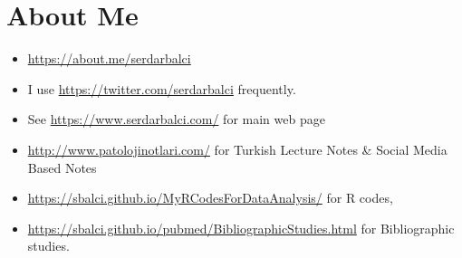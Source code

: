 \documentclass[10pt,a4paper,]{twentysecondcv}
\providecommand{\tightlist}{%
  \setlength{\itemsep}{0pt}\setlength{\parskip}{0pt}}
\begin{document}



\makeprofile %




\hypertarget{about-me}{%
\section{About Me}\label{about-me}}

\begin{itemize}
\tightlist
\item
  \url{https://about.me/serdarbalci}
\item
  I use \url{https://twitter.com/serdarbalci} frequently.
\item
  See \url{https://www.serdarbalci.com/} for main web page
\item
  \url{http://www.patolojinotlari.com/} for Turkish Lecture Notes \& Social Media Based Notes
\item
  \url{https://sbalci.github.io/MyRCodesForDataAnalysis/} for R codes,
\item
  \url{https://sbalci.github.io/pubmed/BibliographicStudies.html} for Bibliographic studies.
\end{itemize}
\end{document}
